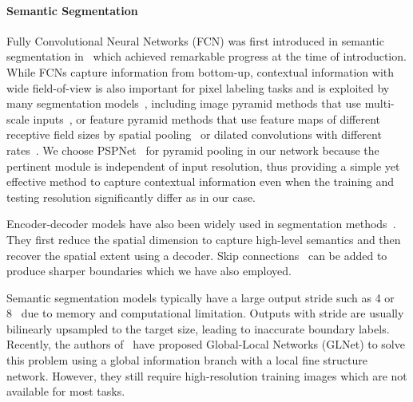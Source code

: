 \documentclass[10pt,twocolumn,letterpaper]{article}
\begin{document}
\paragraph{Semantic Segmentation}
Fully Convolutional Neural Networks (FCN) was first introduced in semantic segmentation in~\cite{long2015fully} which achieved remarkable progress at the time of introduction.
While FCNs capture information from bottom-up, contextual information with wide field-of-view is also important for pixel labeling tasks and is exploited by many segmentation models~\cite{chen2017deeplab, chen2016attention, farabet2012learning, he2004multiscale, Mostajabi2015feedforward, shotton2009textonboost, zhang2018context}, including image pyramid methods that use multi-scale inputs~\cite{chen2016attention, Dai2015ConvolutionalFM,farabet2012learning, lin2017refinenet, lin2016efficient, pinheiro2014recurrent}, or feature pyramid methods that use feature maps of different receptive field sizes by spatial pooling~\cite{liu2015parsenet, zhao2017pyramid} or dilated convolutions with different rates~\cite{chen2017deeplab, chen2017rethinking, chen2018encoder, li2018pyramid, wang2018understanding, yu2015multi}.
We choose PSPNet~\cite{zhao2017pyramid} for pyramid pooling in our network because the pertinent module is independent of input resolution, thus providing a simple yet effective method to capture contextual information even when the training and testing resolution significantly differ as in our case.

Encoder-decoder models have also been widely used in segmentation methods~\cite{badrinarayanan2015segnet, chen2018encoder, li2018pyramid, liu2019auto, liu2018path, noh2015learning, ronneberger2015u, wang2018understanding}. They first reduce the spatial dimension to capture high-level semantics and then recover the spatial extent using a decoder. Skip connections~\cite{drozdzal2016importance, ronneberger2015u, sun2019high} can be added to produce sharper boundaries which we have also employed.

Semantic segmentation models typically have a large output stride such as 4 or 8~\cite{chen2014semantic, chen2017deeplab, chen2017rethinking} due to memory and computational limitation. Outputs with stride are usually bilinearly upsampled to the target size, leading to inaccurate boundary labels. Recently, the authors of~\cite{chen2019collaborative} have proposed Global-Local Networks (GLNet) to solve this problem using a global information branch with a local fine structure network. However, they still require high-resolution training images which are not available for most tasks.
\end{document}
